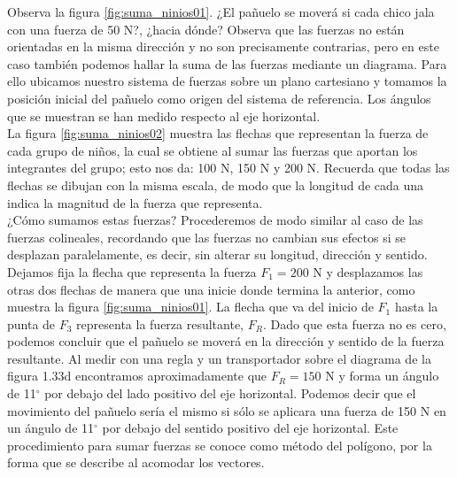 \documentclass[11pt]{book}
\begin{document}
Observa la figura \ref{fig:suma_ninios01}. ¿El pañuelo se moverá si cada chico jala con una
fuerza de 50 N?, ¿hacia dónde? Observa que las fuerzas no están orientadas en la misma
dirección y no son precisamente contrarias, pero en este caso también podemos hallar
la suma de las fuerzas mediante un diagrama. Para ello ubicamos nuestro sistema de
fuerzas sobre un plano cartesiano y tomamos la posición inicial del pañuelo como
origen del sistema de referencia. Los ángulos que se muestran se han medido respecto
al eje horizontal.\\

La figura \ref{fig:suma_ninios02} muestra las flechas que representan la fuerza de cada
grupo de niños, la cual se obtiene al sumar las fuerzas que aportan los integrantes
del grupo; esto nos da: 100 N, 150 N y 200 N. Recuerda que todas las flechas se
dibujan con la misma escala, de modo que la longitud de cada una indica la magnitud
de la fuerza que representa.\\

¿Cómo sumamos estas fuerzas? Procederemos de modo similar al caso de las fuerzas
colineales, recordando que las fuerzas no cambian sus efectos si se desplazan
paralelamente, es decir, sin alterar su longitud, dirección y sentido.\\

Dejamos fija la flecha que representa la fuerza $F_1 = 200$ N y desplazamos las
otras dos flechas de manera que una inicie donde termina la anterior,
como muestra la figura \ref{fig:suma_ninios01}. La flecha que va del inicio
de $F_1$ hasta la punta de $F_3$ representa la fuerza resultante, $F_R$.
Dado que esta fuerza no es cero, podemos concluir que el pañuelo se moverá
en la dirección y sentido de la fuerza resultante. Al medir con una regla y
un transportador sobre el diagrama de la figura 1.33d encontramos
aproximadamente que $F_R = 150$ N y forma un ángulo de 11$^\circ$ por debajo
del lado positivo del eje horizontal. Podemos decir que el movimiento del
pañuelo sería el mismo si sólo se aplicara una fuerza de 150 N en un ángulo
de 11$^\circ$ por debajo del sentido positivo del eje horizontal. Este procedimiento
para sumar fuerzas se conoce como método del polígono, por la forma que
se describe al acomodar los vectores.



\newpage
\end{document}
